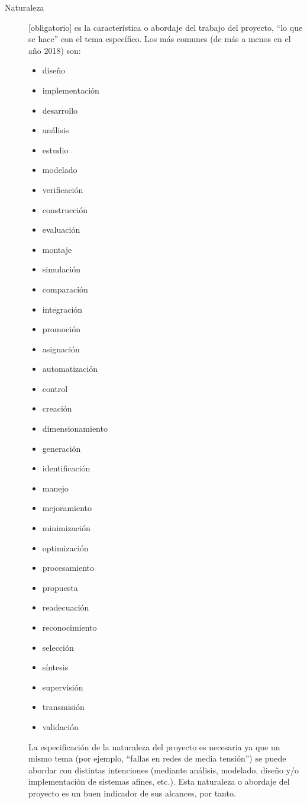 \begin{description}
\item[Naturaleza] [obligatorio] es la característica o abordaje del trabajo del proyecto, ``lo que se hace'' con el tema específico. Los más comunes (de más a menos en el año 2018) son:
\begin{multicols}{3}
\begin{itemize}
\item diseño
\item implementación
\item desarrollo
\item análisis
\item estudio
\item modelado
\item verificación
\item construcción
\item evaluación
\item montaje
\item simulación
\item comparación
\item integración
\item promoción
\item asignación
\item automatización
\item control
\item creación
\item dimensionamiento
\item generación
\item identificación
\item manejo
\item mejoramiento
\item minimización
\item optimización
\item procesamiento
\item propuesta
\item readecuación
\item reconocimiento
\item selección
\item síntesis
\item supervisión
\item transmisión
\item validación
\end{itemize}
\end{multicols}

La especificación de la naturaleza del proyecto es necesaria ya que un mismo tema (por ejemplo, ``fallas en redes de media tensión'') se puede abordar con distintas intenciones (mediante análisis, modelado, diseño y/o implementación de sistemas afines, etc.). Esta naturaleza o abordaje del proyecto es un buen indicador de sus alcances, por tanto.


\end{description}
